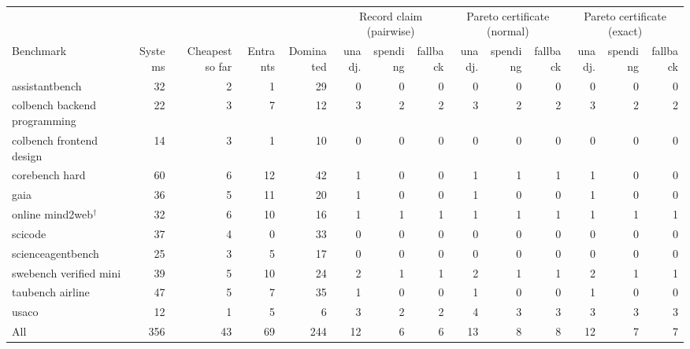 \begin{tabular}{lrrrrrrrrrrrrr}
\toprule
 & & & & & \multicolumn{3}{c}{Record claim (pairwise)} & \multicolumn{3}{c}{Pareto certificate (normal)} & \multicolumn{3}{c}{Pareto certificate (exact)} \\
Benchmark & Systems & Cheapest so far & Entrants & Dominated & unadj. & spending & fallback & unadj. & spending & fallback & unadj. & spending & fallback \\
\midrule
assistantbench & 32 & 2 & 1 & 29 & 0 & 0 & 0 & 0 & 0 & 0 & 0 & 0 & 0 \\
colbench backend programming & 22 & 3 & 7 & 12 & 3 & 2 & 2 & 3 & 2 & 2 & 3 & 2 & 2 \\
colbench frontend design & 14 & 3 & 1 & 10 & 0 & 0 & 0 & 0 & 0 & 0 & 0 & 0 & 0 \\
corebench hard & 60 & 6 & 12 & 42 & 1 & 0 & 0 & 1 & 1 & 1 & 1 & 0 & 0 \\
gaia & 36 & 5 & 11 & 20 & 1 & 0 & 0 & 1 & 0 & 0 & 1 & 0 & 0 \\
online mind2web$^{\dagger}$ & 32 & 6 & 10 & 16 & 1 & 1 & 1 & 1 & 1 & 1 & 1 & 1 & 1 \\
scicode & 37 & 4 & 0 & 33 & 0 & 0 & 0 & 0 & 0 & 0 & 0 & 0 & 0 \\
scienceagentbench & 25 & 3 & 5 & 17 & 0 & 0 & 0 & 0 & 0 & 0 & 0 & 0 & 0 \\
swebench verified mini & 39 & 5 & 10 & 24 & 2 & 1 & 1 & 2 & 1 & 1 & 2 & 1 & 1 \\
taubench airline & 47 & 5 & 7 & 35 & 1 & 0 & 0 & 1 & 0 & 0 & 1 & 0 & 0 \\
usaco & 12 & 1 & 5 & 6 & 3 & 2 & 2 & 4 & 3 & 3 & 3 & 3 & 3 \\
\midrule
All & 356 & 43 & 69 & 244 & 12 & 6 & 6 & 13 & 8 & 8 & 12 & 7 & 7 \\
\bottomrule
\end{tabular}
